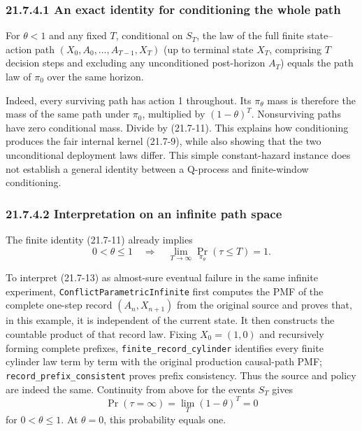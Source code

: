 \documentclass[
  english,
  11pt,
  oneside]{book}
\begin{document}
\subsubsection{21.7.4.1 An exact identity for conditioning the whole path}\label{an-exact-identity-for-conditioning-the-whole-path}

For \(\theta<1\) and any fixed \(T\), conditional on \(S_T\), the law of the full finite state--action path \((X_0,A_0,\dots,A_{T-1},X_T)\) (up to terminal state \(X_T\), comprising \(T\) decision steps and excluding any unconditioned post-horizon \(A_T\)) equals the path law of \(\pi_0\) over the same horizon.

Indeed, every surviving path has action 1 throughout. Its \(\pi_\theta\) mass is therefore the mass of the same path under \(\pi_0\), multiplied by \((1-\theta)^T\). Nonsurviving paths have zero conditional mass. Divide by (21.7-11). This explains how conditioning produces the fair internal kernel (21.7-9), while also showing that the two unconditional deployment laws differ. This simple constant-hazard instance does not establish a general identity between a Q-process and finite-window conditioning.

\subsubsection{21.7.4.2 Interpretation on an infinite path space}\label{interpretation-on-an-infinite-path-space}

The finite identity (21.7-11) already implies \[0<\theta\le1\quad\Longrightarrow\quad
\lim_{T\to\infty}\Pr_{\pi_\theta}(\tau\le T)=1.         \tag{21.7-13}\]

To interpret (21.7-13) as almost-sure eventual failure in the same infinite experiment, \nolinkurl{ConflictParametricInfinite} first computes the PMF of the complete one-step record \((A_n,X_{n+1})\) from the original source and proves that, in this example, it is independent of the current state. It then constructs the countable product of that record law. Fixing \(X_0=(1,0)\) and recursively forming complete prefixes, \nolinkurl{finite_record_cylinder} identifies every finite cylinder law term by term with the original production causal-path PMF; \nolinkurl{record_prefix_consistent} proves prefix consistency. Thus the source and policy are indeed the same. Continuity from above for the events \(S_T\) gives \[\Pr(\tau=\infty)=\lim_T(1-\theta)^T=0\] for \(0<\theta\le1\). At \(\theta=0\), this probability equals one.
\end{document}
